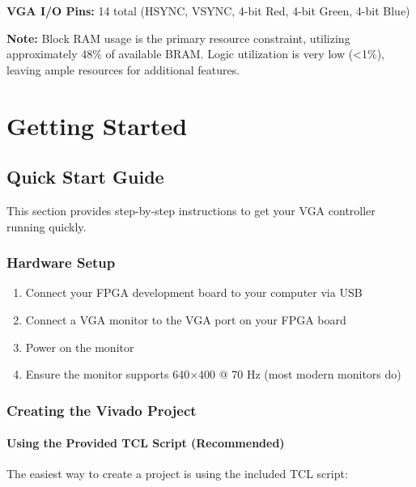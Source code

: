 \documentclass[11pt,letterpaper]{report}
\begin{document}
\textbf{VGA I/O Pins:} 14 total (HSYNC, VSYNC, 4-bit Red, 4-bit Green, 4-bit Blue)

\textbf{Note:} Block RAM usage is the primary resource constraint, utilizing approximately 48\% of available BRAM. Logic utilization is very low (<1\%), leaving ample resources for additional features.

\chapter{Getting Started}

\section{Quick Start Guide}

This section provides step-by-step instructions to get your VGA controller running quickly.

\subsection{Hardware Setup}

\begin{enumerate}
    \item Connect your FPGA development board to your computer via USB
    \item Connect a VGA monitor to the VGA port on your FPGA board
    \item Power on the monitor
    \item Ensure the monitor supports 640$\times$400 @ 70 Hz (most modern monitors do)
\end{enumerate}

\subsection{Creating the Vivado Project}

\subsubsection{Using the Provided TCL Script (Recommended)}

The easiest way to create a project is using the included TCL script:
\end{document}
